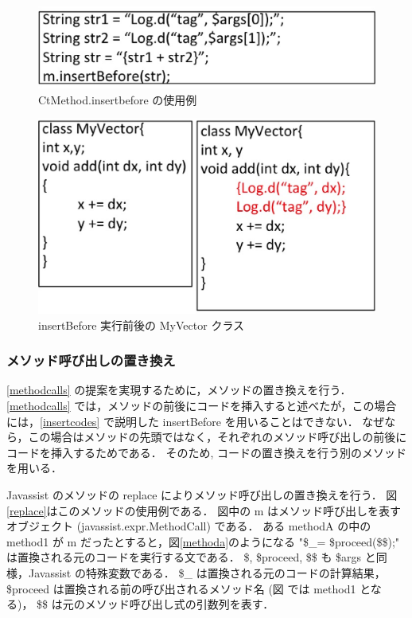 \begin{figure}[t]
\begin{center}
\graphicspath{{./epsfiles/}}
\includegraphics[scale=0.3]{insertbefore2.eps}
\end{center}
\caption{CtMethod.insertbefore の使用例}
\label{insertbefore}
\end{figure}


\begin{figure}[t]
\begin{center}
\graphicspath{{./epsfiles/}}
\includegraphics[scale=0.3]{vector.eps}
\end{center}
\caption{insertBefore 実行前後の MyVector クラス}
\label{vector}
\end{figure}

\subsubsection{メソッド呼び出しの置き換え}
\label{replacement}
\ref{methodcalls} の提案を実現するために，メソッドの置き換えを行う．
\ref{methodcalls} では，メソッドの前後にコードを挿入すると述べたが，この場合には，\ref{insertcodes} で説明した insertBefore を用いることはできない．
なぜなら，この場合はメソッドの先頭ではなく，それぞれのメソッド呼び出しの前後にコードを挿入するためである．
そのため, コードの置き換えを行う別のメソッドを用いる．

 Javassist のメソッドの replace によりメソッド呼び出しの置き換えを行う．
図\ref{replace}はこのメソッドの使用例である．
図中の m はメソッド呼び出しを表すオブジェクト (javassist.expr.MethodCall) である．
ある methodA の中の method1 が m だったとすると，図\ref{methoda}のようになる
"\$\_= \$proceed(\$\$);" は置換される元のコードを実行する文である．
\$, \$proceed, \$\$ も \$args と同様，Javassist の特殊変数である．
\$\_ は置換される元のコードの計算結果，\$proceed は置換される前の呼び出されるメソッド名 (図  では method1 となる)， \$\$ は元のメソッド呼び出し式の引数列を表す．

